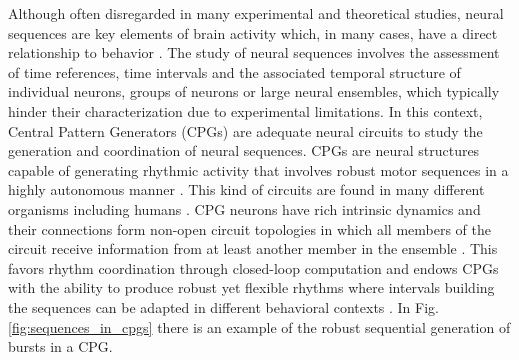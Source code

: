 Although often disregarded in many experimental and theoretical studies, neural sequences are key elements of brain activity which, in many cases, have a direct relationship to behavior \parencite{hahnloser_ultra-sparse_2002,venaille_synchronization_2005,hb10,buzsaki_space_2018,rabinovich_discrete_2018,paton_neural_2018,elices_robust_2019}.
The study of neural sequences involves the assessment of time references, time intervals and the associated temporal structure of individual neurons, groups of neurons or large neural ensembles, which typically hinder their characterization due to experimental limitations. In this context, Central Pattern Generators (CPGs) are adequate neural circuits to study the generation and coordination of neural sequences. 
CPGs are neural structures capable of generating rhythmic activity that involves robust motor sequences in a highly autonomous manner \parencite{hartline_mottor_1976,selverston_reliable_2000,marder_central_2001}. This kind of circuits are found in many different organisms including humans \parencite{dimitrijevic_evidence_1998,pavlidis_neonatal_2016, arichi_localization_2017}. CPG neurons have rich intrinsic dynamics and their connections form non-open circuit topologies in which all members of the circuit receive information from at least another member in the ensemble \cite{selverston_reliable_2000,huerta_topology_2001}. This favors rhythm coordination through closed-loop computation and endows CPGs with the ability to produce robust yet flexible rhythms where intervals building the sequences can be adapted in different behavioral contexts \parencite{elices_robust_2019}. %
In Fig. \ref{fig:sequences_in_cpgs} there is an example of the robust sequential generation of bursts in a CPG. 

